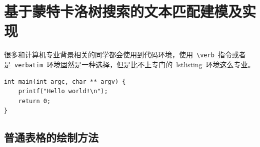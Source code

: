 %
%






\chapter{基于蒙特卡洛树搜索的文本匹配建模及实现}

很多和计算机专业背景相关的同学都会使用到代码环境，使用~\verb|\verb|~指令或者是~\verb|verbatim|~环境固然是一种选择，但是比不上专门的~lstlisting~环境这么专业。

\begin{lstlisting}
int main(int argc, char ** argv) {
    printf("Hello world!\n");
    return 0;
}
\end{lstlisting}

\section{普通表格的绘制方法}

